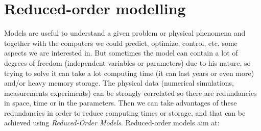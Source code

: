 \documentclass[twoside,11pt]{Latex/Classes/PhDthesisPSnPDF_jacob}
\begin{document}
			
	\mainmatter				

    		\graphicspath{{figures/PNG/}{figures/PDF/}{figures/}}		
		\onehalfspacing
%																
\else%
	\graphicspath{{1_introduction/figures/PNG/}{1_introduction/figures/PDF/}{1_introduction/figures/}}							
\fi%
%															
%															




\chapter{Reduced-order modelling}

Models are useful to understand a given problem or physical phenomena and together with the computers we could predict, optimize, control, etc. some aspects we are interested in. But sometimes the model can contain a lot of degrees of freedom (independent variables or parameters) due to his nature, so trying to solve it can take a lot computing time (it can last years or even more) and/or heavy memory storage. The physical data (numerical simulations, measurements experiments) can be strongly correlated so there are redundancies in space, time or in the parameters. Then we can take advantages of these redundancies in order to reduce computing times or storage, and that can be achieved using \textit{Reduced-Order Models}. Reduced-order models aim at:
\end{document}
